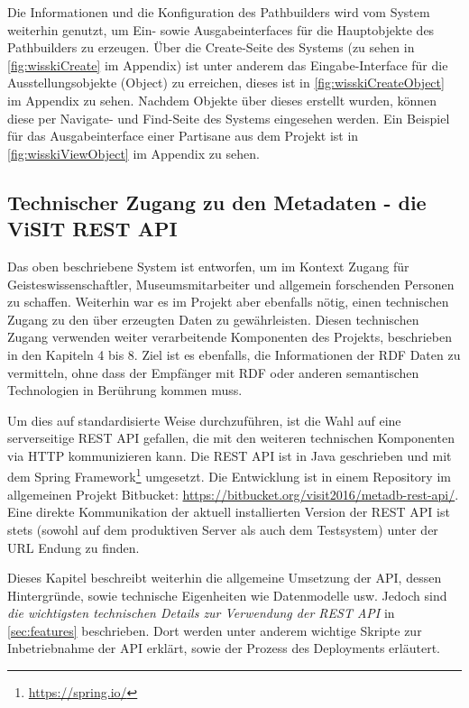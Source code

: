 \begin{description}
\end{description}

Die Informationen und die Konfiguration des Pathbuilders wird vom \wisski System weiterhin genutzt, um Ein- sowie Ausgabeinterfaces für die Hauptobjekte des Pathbuilders zu erzeugen. Über die Create-Seite des \wisski Systems (zu sehen in \autoref{fig:wisskiCreate} im Appendix) ist unter anderem das Eingabe-Interface für die Ausstellungsobjekte (Object) zu erreichen, dieses ist in \autoref{fig:wisskiCreateObject} im Appendix zu sehen. Nachdem Objekte über dieses erstellt wurden, können diese per Navigate- und Find-Seite des \wisski Systems eingesehen werden. Ein Beispiel für das Ausgabeinterface einer Partisane aus dem \visit Projekt ist in \autoref{fig:wisskiViewObject} im Appendix zu sehen.

\subsection{Technischer Zugang zu den Metadaten - die ViSIT REST API}\label{sec:rest}

Das oben beschriebene \wisski System ist entworfen, um im \visit Kontext Zugang für Geisteswissenschaftler, Museumsmitarbeiter und allgemein forschenden Personen zu schaffen. Weiterhin war es im \visit Projekt aber ebenfalls nötig, einen technischen Zugang zu den über \wisski erzeugten Daten zu gewährleisten. Diesen technischen Zugang verwenden weiter verarbeitende Komponenten des Projekts, beschrieben in den Kapiteln 4 bis 8. Ziel ist es ebenfalls, die Informationen der RDF Daten zu vermitteln, ohne dass der Empfänger mit RDF oder anderen semantischen Technologien in Berührung kommen muss.

Um dies auf standardisierte Weise durchzuführen, ist die Wahl auf eine serverseitige REST API gefallen, die mit den weiteren technischen Komponenten via HTTP kommunizieren kann. Die REST API ist in Java geschrieben und mit dem Spring Framework\footnote{\url{https://spring.io/}} umgesetzt. Die Entwicklung ist in einem Repository im allgemeinen \visit Projekt Bitbucket: \url{https://bitbucket.org/visit2016/metadb-rest-api/}. Eine direkte Kommunikation der aktuell installierten Version der REST API ist stets (sowohl auf dem produktiven Server als auch dem Testsystem) unter der URL Endung \texttt{} zu finden.

Dieses Kapitel beschreibt weiterhin die allgemeine Umsetzung der API, dessen Hintergründe, sowie technische Eigenheiten wie Datenmodelle usw. Jedoch sind \textit{die wichtigsten technischen Details zur Verwendung der \visit REST API} in \autoref{sec:features} beschrieben. Dort werden unter anderem wichtige Skripte zur Inbetriebnahme der API erklärt, sowie der Prozess des Deployments erläutert.

